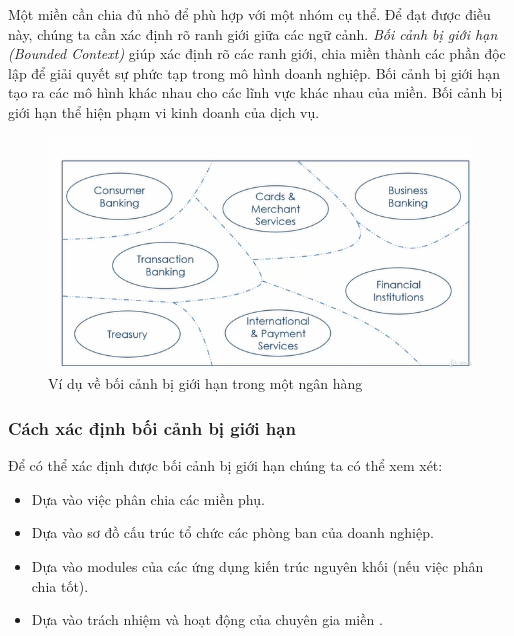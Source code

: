 Một miền cần chia đủ nhỏ để phù hợp với một nhóm cụ thể. Để đạt được điều này, chúng ta cần xác định rõ ranh giới giữa các ngữ cảnh. \emph{Bối cảnh bị giới hạn (Bounded Context)} giúp xác định rõ các ranh giới, chia miền thành các phần độc lập để giải quyết sự phức tạp trong mô hình doanh nghiệp. Bối cảnh bị giới hạn tạo ra các mô hình khác nhau cho các lĩnh vực khác nhau của miền. Bối cảnh bị giới hạn thể hiện phạm vi kinh doanh của dịch vụ.

\begin{figure}[H]

\centering

\includegraphics[scale = 1]{pictures/boi_canh_gioi_han/main.png}

\caption{Ví dụ về bối cảnh bị giới hạn trong một ngân hàng}

\end{figure}

\subsubsection{Cách xác định bối cảnh bị giới hạn}

Để có thể xác định được bối cảnh bị giới hạn chúng ta có thể xem xét:

\begin{itemize}

\item Dựa vào việc phân chia các miền phụ.

\item Dựa vào sơ đồ cấu trúc tổ chức các phòng ban của doanh nghiệp.

\item Dựa vào modules của các ứng dụng kiến trúc nguyên khối (nếu việc phân chia tốt).

\item Dựa vào trách nhiệm và hoạt động của chuyên gia miền .

\end{itemize}

